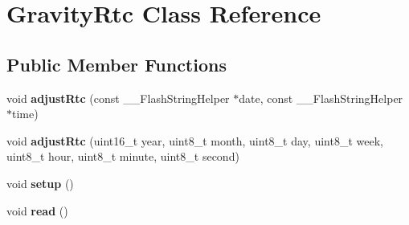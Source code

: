 \hypertarget{class_gravity_rtc}{}\section{Gravity\+Rtc Class Reference}
\label{class_gravity_rtc}
\subsection*{Public Member Functions}
\begin{DoxyCompactItemize}
\item 
void {\bfseries adjust\+Rtc} (const \+\_\+\+\_\+\+Flash\+String\+Helper $\ast$date, const \+\_\+\+\_\+\+Flash\+String\+Helper $\ast$time)\hypertarget{class_gravity_rtc_af98ba41a948771253e5e936063a817d3}{}\label{class_gravity_rtc_af98ba41a948771253e5e936063a817d3}

\item 
void {\bfseries adjust\+Rtc} (uint16\+\_\+t year, uint8\+\_\+t month, uint8\+\_\+t day, uint8\+\_\+t week, uint8\+\_\+t hour, uint8\+\_\+t minute, uint8\+\_\+t second)\hypertarget{class_gravity_rtc_afd60ca78ef607244348873630ccf9259}{}\label{class_gravity_rtc_afd60ca78ef607244348873630ccf9259}

\item 
void {\bfseries setup} ()\hypertarget{class_gravity_rtc_ac4035c99a3e51f7b643628ab885c176b}{}\label{class_gravity_rtc_ac4035c99a3e51f7b643628ab885c176b}

\item 
void {\bfseries read} ()\hypertarget{class_gravity_rtc_ab4d3d5800f67e1362502be92107cd8b9}{}\label{class_gravity_rtc_ab4d3d5800f67e1362502be92107cd8b9}

\end{DoxyCompactItemize}
